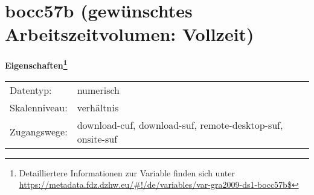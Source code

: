 
    \setcounter{footnote}{0}

    \vspace*{-1.8cm}
	\section{bocc57b (gewünschtes Arbeitszeitvolumen: Vollzeit)}
	\label{section:bocc57b}



    \vspace*{0.5cm}
    \noindent\textbf{Eigenschaften\footnote{Detailliertere Informationen zur Variable finden sich unter
		\url{https://metadata.fdz.dzhw.eu/\#!/de/variables/var-gra2009-ds1-bocc57b$}}}\\
	\begin{tabularx}{\hsize}{@{}lX}
	Datentyp: & numerisch \\
	Skalenniveau: & verhältnis \\
	Zugangswege: &
	  download-cuf, 
	  download-suf, 
	  remote-desktop-suf, 
	  onsite-suf
 \\
    \end{tabularx}



